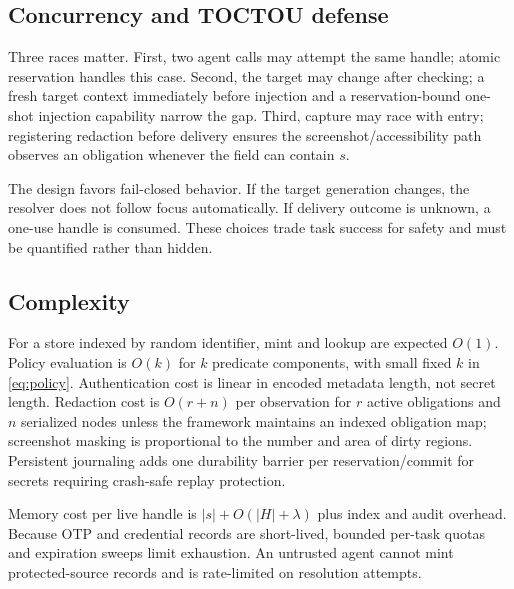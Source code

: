 \subsection{Concurrency and TOCTOU defense}

Three races matter. First, two agent calls may attempt the same handle; atomic reservation handles this case. Second, the target may change after checking; a fresh target context immediately before injection and a reservation-bound one-shot injection capability narrow the gap. Third, capture may race with entry; registering redaction before delivery ensures the screenshot/accessibility path observes an obligation whenever the field can contain $s$.

The design favors fail-closed behavior. If the target generation changes, the resolver does not follow focus automatically. If delivery outcome is unknown, a one-use handle is consumed. These choices trade task success for safety and must be quantified rather than hidden.

\subsection{Complexity}

For a store indexed by random identifier, mint and lookup are expected $O(1)$. Policy evaluation is $O(k)$ for $k$ predicate components, with small fixed $k$ in \cref{eq:policy}. Authentication cost is linear in encoded metadata length, not secret length. Redaction cost is $O(r+n)$ per observation for $r$ active obligations and $n$ serialized nodes unless the framework maintains an indexed obligation map; screenshot masking is proportional to the number and area of dirty regions. Persistent journaling adds one durability barrier per reservation/commit for secrets requiring crash-safe replay protection.

Memory cost per live handle is $|s|+O(|H|+\lambda)$ plus index and audit overhead. Because OTP and credential records are short-lived, bounded per-task quotas and expiration sweeps limit exhaustion. An untrusted agent cannot mint protected-source records and is rate-limited on resolution attempts.

